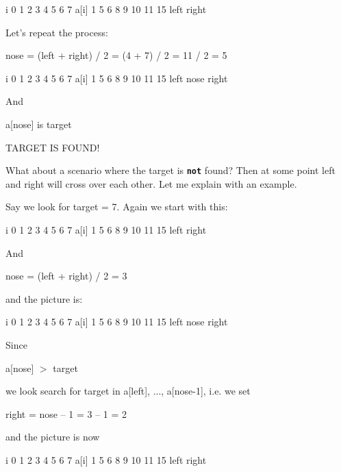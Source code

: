 \begin{consolethree}[escapeinside=||]
i      0    1    2    3    4    5    6    7
a[i]   1    5    6    8    9    10   11   15
                          left           right
\end{consolethree}

Let's repeat the process:

nose = (left + right) / 2 = (4 + 7) / 2 = 11 / 2 = 5

\begin{consolethree}[escapeinside=||]
i      0    1    2    3    4    5    6    7
a[i]   1    5    6    8    9    10   11   15
                          left nose      right
\end{consolethree}

And
\begin{center}
a[nose] is target
\end{center}
TARGET IS FOUND!

What about a scenario where the target is \texttt{\textbf{not}} found?
Then at some point left and right will cross over each other. Let me
explain with an example.

Say we look for target = 7. Again we start with this:

\begin{consolethree}[escapeinside=||]
i      0    1    2    3    4    5    6    7
a[i]   1    5    6    8    9    10   11   15
      left                                right
\end{consolethree}

And

nose = (left + right) / 2 = 3

and the picture is:

\begin{consolethree}[escapeinside=||]
i      0    1    2    3    4    5    6    7
a[i]   1    5    6    8    9    10   11   15
      left           nose                 right
\end{consolethree}

Since
\begin{center}
a[nose] $>$ target
\end{center}
we look search for target in a[left], ..., a[nose-1], i.e. we set
\begin{center}
right = nose -- 1 = 3 -- 1 = 2
\end{center}
and the picture is now

\begin{consolethree}[escapeinside=||]
i      0    1    2    3    4    5    6    7
a[i]   1    5    6    8    9    10   11   15
    left        right
\end{consolethree}

